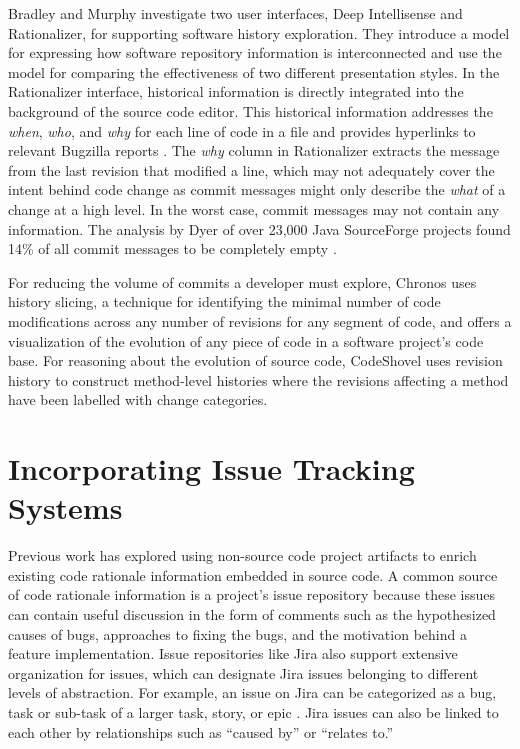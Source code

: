 Bradley and Murphy \cite{bradley_supporting_2011} investigate two user interfaces, Deep Intellisense and Rationalizer, 
for supporting software history exploration.
They introduce a model for expressing how software repository information is interconnected 
and use the model for comparing the effectiveness of two different presentation styles.
In the Rationalizer interface, historical information is directly integrated into the background of the source code editor.
This historical information addresses the \emph{when}, \emph{who}, and \emph{why} for each line of code in a file 
and provides hyperlinks to relevant Bugzilla reports \cite{bradley_supporting_2011}.
The \emph{why} column in Rationalizer extracts the message from the last revision that modified a line, 
which may not adequately cover the intent behind  code change as commit messages 
might only describe the \emph{what} of a change at a high level.
In the worst case, commit messages may not contain any information.
The analysis by Dyer \etal of over 23,000 Java SourceForge projects found 14\% of all 
commit messages to be completely empty \cite{dyer_boa_2013}.

For reducing the volume of commits a developer must explore, Chronos \cite{servant_history_2012} uses history slicing, 
a technique for identifying the minimal number of code modifications across any number of revisions for any segment of code, 
and offers a visualization of the evolution of any piece of code in a software project's code base.
For reasoning about the evolution of source code, CodeShovel \cite{grund_codeshovel_2021} 
uses revision history to construct method-level histories where the revisions affecting a 
method have been labelled with change categories.


\section{Incorporating Issue Tracking Systems}

Previous work has explored using non-source code project artifacts to enrich existing code 
rationale information embedded in source code. 
A common source of code rationale information is a project's issue repository because these 
issues can contain useful discussion in the form of comments such as the hypothesized causes of bugs, 
approaches to fixing the bugs, and the motivation behind a feature implementation. 
Issue repositories like Jira also support extensive organization for issues,
which can designate Jira issues belonging to different levels of abstraction.
For example, an issue on Jira can be categorized as a bug, task or sub-task of a larger task, story, or epic \cite{jira-issue-types}.
Jira issues can also be linked to each other by relationships such as ``caused by'' or ``relates to.''

